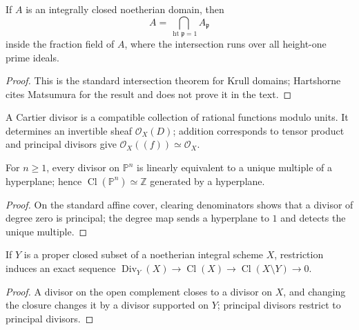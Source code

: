 \begin{proposition}
\label{prop:II-6-3A}
If $A$ is an integrally closed noetherian domain, then
\[
A=\bigcap_{\operatorname{ht}\mathfrak p=1}A_{\mathfrak p}
\]
inside the fraction field of $A$, where the intersection runs over all height-one prime ideals.
\end{proposition}
\begin{proof}
This is the standard intersection theorem for Krull domains; Hartshorne cites Matsumura for the
result and does not prove it in the text.
\end{proof}

\begin{definition}
\label{def:II-6-cartier}
A Cartier divisor is a compatible collection of rational functions modulo units. It determines an
invertible sheaf $\mathcal O_X(D)$; addition corresponds to tensor product and principal divisors give
$\mathcal O_X((f))\simeq\mathcal O_X$.
\end{definition}

\begin{proposition}
\label{prop:II-6-4}
For $n\geq1$, every divisor on $\mathbb P^n$ is linearly equivalent to a unique multiple of a
hyperplane; hence $\operatorname{Cl}(\mathbb P^n)\simeq\mathbb Z$ generated by a hyperplane.
\end{proposition}
\begin{proof}
On the standard affine cover, clearing denominators shows that a divisor of degree zero is principal;
the degree map sends a hyperplane to $1$ and detects the unique multiple.
\end{proof}

\begin{proposition}
\label{prop:II-6-5}
If $Y$ is a proper closed subset of a noetherian integral scheme $X$, restriction induces an exact
sequence $\operatorname{Div}_Y(X)\to\operatorname{Cl}(X)\to\operatorname{Cl}(X\setminus Y)\to0$.
\end{proposition}
\begin{proof}
A divisor on the open complement closes to a divisor on $X$, and changing the closure changes it by
a divisor supported on $Y$; principal divisors restrict to principal divisors.
\end{proof}

